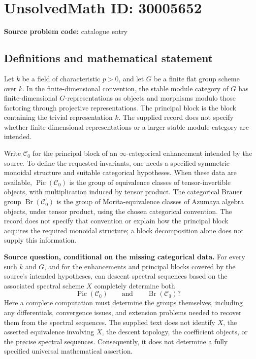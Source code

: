 \documentclass[11pt]{article}
\begin{document}
\section*{UnsolvedMath ID: 30005652}
\textbf{Source problem code:} catalogue entry
\subsection{Definitions and mathematical statement}
Let \(k\) be a field of characteristic \(p>0\), and let \(G\) be a finite flat group scheme over \(k\). In the finite-dimensional convention, the stable module category of \(G\) has finite-dimensional \(G\)-representations as objects and morphisms modulo those factoring through projective representations. The principal block is the block containing the trivial representation \(k\). The supplied record does not specify whether finite-dimensional representations or a larger stable module category are intended.

Write \(\mathcal C_0\) for the principal block of an \(\infty\)-categorical enhancement intended by the source. To define the requested invariants, one needs a specified symmetric monoidal structure and suitable categorical hypotheses. When these data are available, \(\operatorname{Pic}(\mathcal C_0)\) is the group of equivalence classes of tensor-invertible objects, with multiplication induced by tensor product. The categorical Brauer group \(\operatorname{Br}(\mathcal C_0)\) is the group of Morita-equivalence classes of Azumaya algebra objects, under tensor product, using the chosen categorical convention. The record does not specify that convention or explain how the principal block acquires the required monoidal structure; a block decomposition alone does not supply this information.

\textbf{Source question, conditional on the missing categorical data.} For every such \(k\) and \(G\), and for the enhancements and principal blocks covered by the source's intended hypotheses, can descent spectral sequences based on the associated spectral scheme \(X\) completely determine both
\[
\operatorname{Pic}(\mathcal C_0)
\qquad\text{and}\qquad
\operatorname{Br}(\mathcal C_0)?
\]
Here a complete computation must determine the groups themselves, including any differentials, convergence issues, and extension problems needed to recover them from the spectral sequences. The supplied text does not identify \(X\), the asserted equivalence involving \(X\), the descent topology, the coefficient objects, or the precise spectral sequences. Consequently, it does not determine a fully specified universal mathematical assertion.
\end{document}
